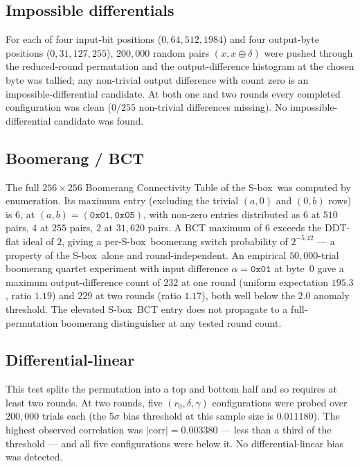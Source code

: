 \documentclass[11pt]{article}
\newcommand{\sbx}{S\nobreakdash-box}
\begin{document}
\subsection{Impossible differentials}
For each of four input-bit positions ($0,64,512,1984$) and four output-byte
positions ($0,31,127,255$), $200{,}000$ random pairs $(x,x\oplus\delta)$ were
pushed through the reduced-round permutation and the output-difference histogram
at the chosen byte was tallied; any non-trivial output difference with count
zero is an impossible-differential candidate. At both one and two rounds every
completed configuration was clean ($0/255$ non-trivial differences missing). No
impossible-differential candidate was found.

\subsection{Boomerang / BCT}
The full $256\times256$ Boomerang Connectivity Table of the \sbx\ was computed by
enumeration. Its maximum entry (excluding the trivial $(a,0)$ and $(0,b)$ rows)
is $6$, at $(a,b)=(\mathtt{0x01},\mathtt{0x05})$, with non-zero entries
distributed as $6$ at $510$ pairs, $4$ at $255$ pairs, $2$ at $31{,}620$ pairs.
A BCT maximum of $6$ exceeds the DDT-flat ideal of $2$, giving a per-\sbx\
boomerang switch probability of $2^{-5.42}$ --- a property of the \sbx\ alone and
round-independent. An empirical $50{,}000$-trial boomerang quartet experiment
with input difference $\alpha=\mathtt{0x01}$ at byte~$0$ gave a maximum
output-difference count of $232$ at one round (uniform expectation $195.3$, ratio
$1.19$) and $229$ at two rounds (ratio $1.17$), both well below the $2.0$ anomaly
threshold. The elevated \sbx\ BCT entry does not propagate to a full-permutation
boomerang distinguisher at any tested round count.

\subsection{Differential-linear}
This test splits the permutation into a top and bottom half and so requires at
least two rounds. At two rounds, five $(r_0,\delta,\gamma)$ configurations were
probed over $200{,}000$ trials each (the $5\sigma$ bias threshold at this sample
size is $0.011180$). The highest observed correlation was $|\mathrm{corr}|=
0.003380$ --- less than a third of the threshold --- and all five configurations
were below it. No differential-linear bias was detected.
\end{document}
